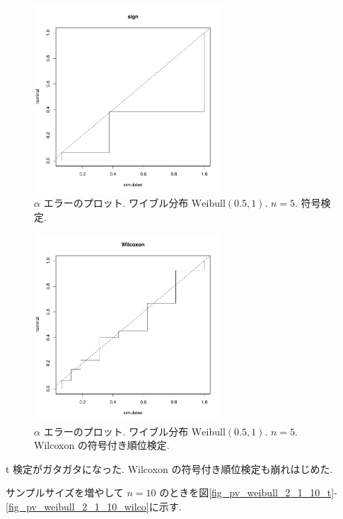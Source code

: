 \documentclass[12pt]{jsarticle}
\begin{document}
 \begin{figure}[htbp]
 \begin{center}
  \includegraphics[width=70mm]{img/pv_weibull_05_1_n5_sign.pdf}
 \end{center}
      \caption{$\alpha$ エラーのプロット. ワイブル分布 $\mathrm{Weibull}(0.5,1)$. $n=5$. 符号検定.}
     \end{figure}  

 \begin{figure}[htbp]
 \begin{center}
  \includegraphics[width=70mm]{img/pv_weibull_05_1_n5_wilco.pdf}
 \end{center}
       \caption{$\alpha$ エラーのプロット. ワイブル分布 $\mathrm{Weibull}(0.5,1)$. $n=5$. Wilcoxon の符号付き順位検定.}
  \label{fig_pv_weibull_05_1_5_wilco}
\end{figure}

t 検定がガタガタになった. Wilcoxon の符号付き順位検定も崩れはじめた.

サンプルサイズを増やして $n=10$ のときを図\ref{fig_pv_weibull_2_1_10_t}-\ref{fig_pv_weibull_2_1_10_wilco}に示す. 
\end{document}
